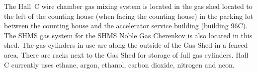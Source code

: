 
The Hall~C wire chamber gas mixing system is located in the gas shed located
to the left of the counting house (when facing the counting house)
in the parking lot between the counting house
and the accelerator service building (building 96C).  The SHMS gas system for
the SHMS Noble Gas Cherenkov is also located in this shed.
The gas cylinders in use are along the outside of the Gas Shed
in a fenced area. There are racks next to the Gas Shed for storage
of full gas cylinders.  Hall C currently uses ethane, argon, ethanol,
carbon dioxide, nitrogen and neon.
